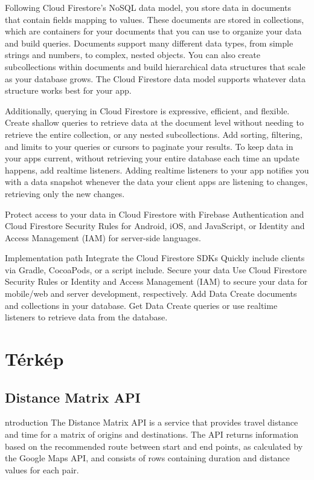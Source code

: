 Following Cloud Firestore's NoSQL data model, you store data in documents that contain fields mapping to values. These documents are stored in collections, which are containers for your documents that you can use to organize your data and build queries. Documents support many different data types, from simple strings and numbers, to complex, nested objects. You can also create subcollections within documents and build hierarchical data structures that scale as your database grows. The Cloud Firestore data model supports whatever data structure works best for your app.

Additionally, querying in Cloud Firestore is expressive, efficient, and flexible. Create shallow queries to retrieve data at the document level without needing to retrieve the entire collection, or any nested subcollections. Add sorting, filtering, and limits to your queries or cursors to paginate your results. To keep data in your apps current, without retrieving your entire database each time an update happens, add realtime listeners. Adding realtime listeners to your app notifies you with a data snapshot whenever the data your client apps are listening to changes, retrieving only the new changes.

Protect access to your data in Cloud Firestore with Firebase Authentication and Cloud Firestore Security Rules for Android, iOS, and JavaScript, or Identity and Access Management (IAM) for server-side languages.

Implementation path
Integrate the Cloud Firestore SDKs	Quickly include clients via Gradle, CocoaPods, or a script include.
Secure your data	Use Cloud Firestore Security Rules or Identity and Access Management (IAM) to secure your data for mobile/web and server development, respectively.
Add Data	Create documents and collections in your database.
Get Data	Create queries or use realtime listeners to retrieve data from the database.

\section{Térkép}\label{sec:ALAP:szerkeszt}

\subsection{Distance Matrix API}

ntroduction
The Distance Matrix API is a service that provides travel distance and time for a matrix of origins and destinations. The API returns information based on the recommended route between start and end points, as calculated by the Google Maps API, and consists of rows containing duration and distance values for each pair.

